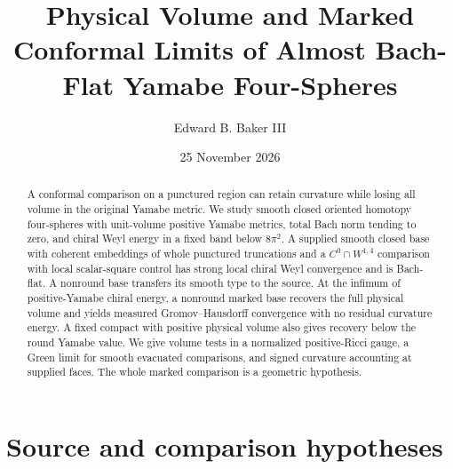 \documentclass[11pt]{article}
\title{Physical Volume and Marked Conformal Limits of Almost Bach-Flat Yamabe Four-Spheres}
\author{Edward B. Baker III}
\date{25 November 2026}
\theoremstyle{definition}
\theoremstyle{remark}
\begin{document}
\maketitle

\begin{abstract}
A conformal comparison on a punctured region can retain curvature while losing all volume in the original Yamabe metric. We study smooth closed oriented homotopy four-spheres with unit-volume positive Yamabe metrics, total Bach norm tending to zero, and chiral Weyl energy in a fixed band below \(8\pi^2\). A supplied smooth closed base with coherent embeddings of whole punctured truncations and a \(C^0\cap W^{1,4}\) comparison with local scalar-square control has strong local chiral Weyl convergence and is Bach-flat. A nonround base transfers its smooth type to the source. At the infimum of positive-Yamabe chiral energy, a nonround marked base recovers the full physical volume and yields measured Gromov--Hausdorff convergence with no residual curvature energy. A fixed compact with positive physical volume also gives recovery below the round Yamabe value. We give volume tests in a normalized positive-Ricci gauge, a Green limit for smooth evacuated comparisons, and signed curvature accounting at supplied faces. The whole marked comparison is a geometric hypothesis.
\end{abstract}

\section{Source and comparison hypotheses}
\end{document}
